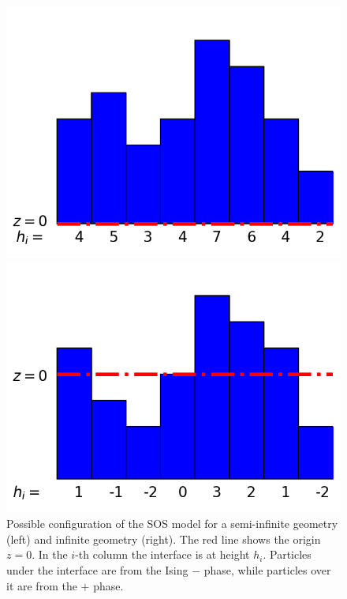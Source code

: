 {\begin{figure}
    \begin{minipage}[t]{0.5\linewidth}
        \includegraphics[width=0.9\linewidth]{int-dyn/sos-indiscernable.png}
    \end{minipage}
    \begin{minipage}[t]{0.5\linewidth}
        \includegraphics[width=0.9\linewidth]{int-dyn/sos-indiscernable-inf.png}        
    \end{minipage}    
    \caption{Possible configuration of the SOS model for a semi-infinite geometry (left) and infinite geometry (right). The red line shows the origin $z=0$. In the $i$-th column the interface is at height $h_i$. Particles under the interface are from the Ising $-$ phase, while particles over it are from the $+$ phase.}
    \label{figure-sos}
\end{figure}

}
